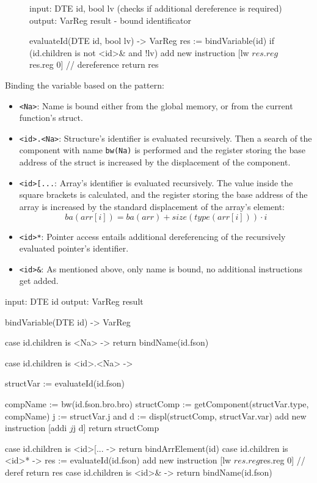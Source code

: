 \begin{figure}[h]
\centering
\begin{codeblock}
input: DTE id, bool lv (checks if additional dereference is required)
output: VarReg result - bound identificator

evaluateId(DTE id, bool lv) -> VarReg {
    res := bindVariable(id)
    if (id.children is not <id>& and !lv) {
        add new instruction [lw $res.reg $res.reg 0] // dereference
    }
    return res
}
\end{codeblock}
\label{fig:evalId}
\end{figure}

\newpage
Binding the variable based on the pattern:
\begin{itemize}
\item \verb+<Na>+: Name is bound either from the global memory, or from the current function's struct.
\item \verb+<id>.<Na>+: Structure's identifier is evaluated recursively. Then a search of the component
with name \verb+bw(Na)+ is performed and the register storing the base address of the struct is increased by
the displacement of the component.
\item \verb+<id>[...+: Array's identifier is evaluated recursively. The value inside the square brackets is calculated,
and the register storing the base address of the array is increased by the standard displacement of the array's element:
\[ba(arr[i]) = ba(arr) + size(type(arr[i])) \cdot i\]
\item \verb+<id>*+: Pointer access entails additional dereferencing of the recursively evaluated pointer's identifier.
\item \verb+<id>&+: As mentioned above, only name is bound, no additional instructions get added.
\end{itemize}

\begin{codeblock}
input: DTE id
output: VarReg result

bindVariable(DTE id) -> VarReg {
    case id.children is <Na> -> {
        return bindName(id.fson)
    }

    case id.children is <id>.<Na> -> {
        structVar := evaluateId(id.fson)

        compName := bw(id.fson.bro.bro)
        structComp := getComponent(structVar.type, compName)
        j := structVar.j and d := displ(structComp, structVar.var)
        add new instruction [addi $j $j d]
        return structComp
    }

    case id.children is <id>[... -> return bindArrElement(id)
    case id.children is <id>* -> {
        res := evaluateId(id.fson)
        add new instruction [lw $res.reg $res.reg 0] // deref
        return res
    }
    case id.children is <id>& -> {
        return bindName(id.fson)
    }
}
\end{codeblock}

